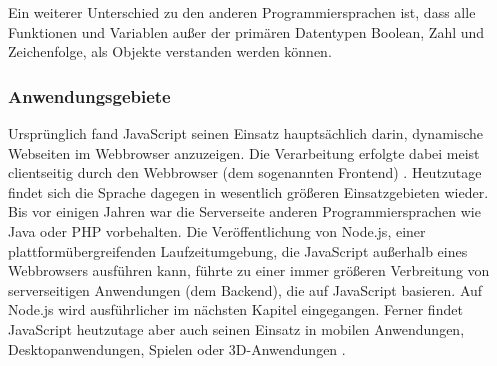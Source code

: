 Ein weiterer Unterschied zu den anderen Programmiersprachen ist, dass alle Funktionen und Variablen außer der primären Datentypen Boolean, Zahl und Zeichenfolge, als Objekte verstanden werden können.

\subsubsection{Anwendungsgebiete}
Ursprünglich fand JavaScript seinen Einsatz hauptsächlich darin, dynamische Webseiten im Web\-browser anzuzeigen. Die Verarbeitung erfolgte dabei meist clientseitig durch den Webbrowser (dem sogenannten Frontend) \cite{JS1.3}.
\newline
\noindent
Heutzutage findet sich die Sprache dagegen in wesentlich größeren Einsatzgebieten wieder. 
Bis vor einigen Jahren war die Serverseite anderen Programmiersprachen wie Java oder PHP vorbehalten. Die Veröffentlichung von Node.js, einer plattformübergreifenden Laufzeitumgebung, die JavaScript außerhalb eines Webbrowsers ausführen kann, führte zu einer immer größeren Verbreitung von serverseitigen Anwendungen (dem Backend), die auf JavaScript basieren. Auf Node.js wird ausführlicher im nächsten Kapitel eingegangen. 
Ferner findet JavaScript heutzutage aber auch seinen Einsatz in mobilen Anwendungen, Desktopanwendungen, Spielen oder 3D-Anwendungen \cite{JS1.4}.

